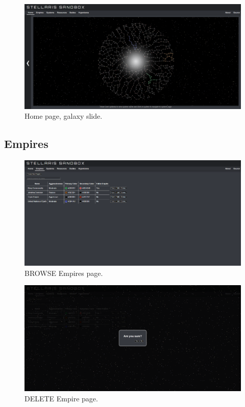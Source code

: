 \documentclass[12pt]{article}
\let\Oldsubsection\subsection
\renewcommand{\subsection}{\FloatBarrier\Oldsubsection}
\begin{document}
\begin{figure}[!ht]
  \caption{Home page, galaxy slide.}
  \includegraphics[width=\textwidth]{screenshots/home/home_galaxy.png}
\end{figure}

\newpage
\subsection{Empires}

\begin{figure}[!ht]
  \caption{BROWSE Empires page.}
  \includegraphics[width=\textwidth]{screenshots/empires/empire_browse.png}
\end{figure}

\begin{figure}[!ht]
  \caption{DELETE Empire page.}
  \includegraphics[width=\textwidth]{screenshots/empires/empire_delete.png}
\end{figure}
\end{document}
